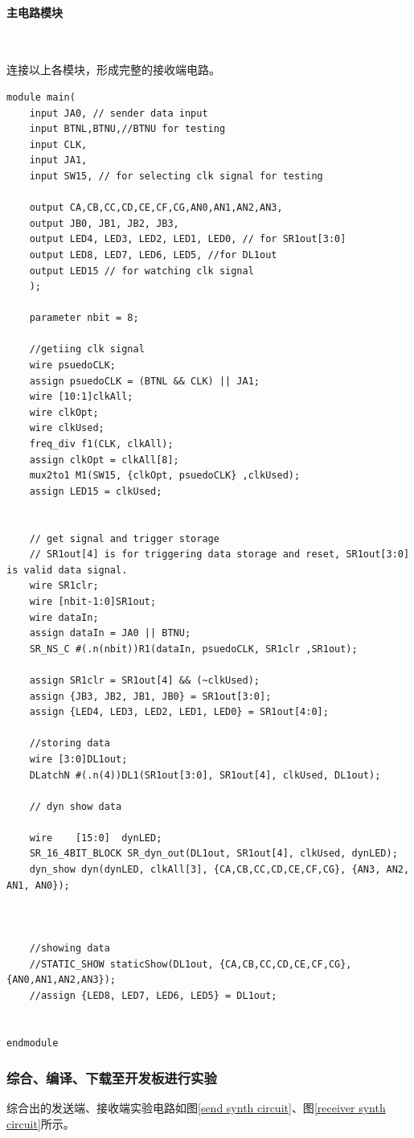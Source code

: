 \documentclass[UTF8]{ctexart}
\numberwithin{figure}{subsection}
\numberwithin{table}{subsection}
\numberwithin{equation}{subsection}
\begin{document}
\paragraph{主电路模块}~
\par 连接以上各模块，形成完整的接收端电路。
\begin{lstlisting}[style={verilog-style}]
module main(
    input JA0, // sender data input
    input BTNL,BTNU,//BTNU for testing
    input CLK,
    input JA1,
    input SW15, // for selecting clk signal for testing

    output CA,CB,CC,CD,CE,CF,CG,AN0,AN1,AN2,AN3,
    output JB0, JB1, JB2, JB3,
    output LED4, LED3, LED2, LED1, LED0, // for SR1out[3:0]
    output LED8, LED7, LED6, LED5, //for DL1out
    output LED15 // for watching clk signal
    );

    parameter nbit = 8;

    //getiing clk signal
    wire psuedoCLK;
    assign psuedoCLK = (BTNL && CLK) || JA1;
    wire [10:1]clkAll;
    wire clkOpt;
    wire clkUsed;
    freq_div f1(CLK, clkAll);
    assign clkOpt = clkAll[8];
    mux2to1 M1(SW15, {clkOpt, psuedoCLK} ,clkUsed);
    assign LED15 = clkUsed;


    // get signal and trigger storage
    // SR1out[4] is for triggering data storage and reset, SR1out[3:0] is valid data signal.
    wire SR1clr;
    wire [nbit-1:0]SR1out;
    wire dataIn;
    assign dataIn = JA0 || BTNU;
    SR_NS_C #(.n(nbit))R1(dataIn, psuedoCLK, SR1clr ,SR1out);
    
    assign SR1clr = SR1out[4] && (~clkUsed);
    assign {JB3, JB2, JB1, JB0} = SR1out[3:0];
    assign {LED4, LED3, LED2, LED1, LED0} = SR1out[4:0];

    //storing data
    wire [3:0]DL1out;
    DLatchN #(.n(4))DL1(SR1out[3:0], SR1out[4], clkUsed, DL1out);

    // dyn show data

    wire    [15:0]  dynLED;
    SR_16_4BIT_BLOCK SR_dyn_out(DL1out, SR1out[4], clkUsed, dynLED);
    dyn_show dyn(dynLED, clkAll[3], {CA,CB,CC,CD,CE,CF,CG}, {AN3, AN2, AN1, AN0});



    //showing data
    //STATIC_SHOW staticShow(DL1out, {CA,CB,CC,CD,CE,CF,CG}, {AN0,AN1,AN2,AN3});
    //assign {LED8, LED7, LED6, LED5} = DL1out;


endmodule
\end{lstlisting}


\subsubsection{综合、编译、下载至开发板进行实验}
\par 综合出的发送端、接收端实验电路如图\ref{send synth circuit}、图\ref{receiver synth circuit}所示。
\end{document}
